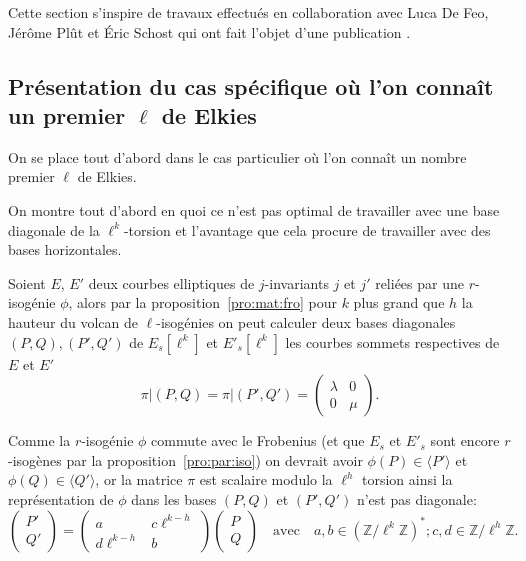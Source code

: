 \documentclass[10pt,a4paper]{book}
\theoremstyle{plain}
\theoremstyle{definition}
\theoremstyle{definition}
\theoremstyle{definition}
\theoremstyle{definition}
\theoremstyle{remark}
\theoremstyle{remark}
\theoremstyle{definition}
\begin{document}
Cette section s'inspire de travaux effectués en collaboration avec Luca De Feo,
J\'er\^ome Pl\^ut et \'Eric Schost qui ont fait l'objet d'une publication 
\cite{Defeo_Plut_Schost_2016}. 


\subsection{Présentation du cas spécifique où l'on connaît un premier $\ell$ de Elkies}
\label{ssec:cou:elk}
On se place tout d'abord dans le cas particulier où l'on connaît un nombre 
premier $\ell$  de Elkies.

On montre tout d'abord en quoi ce n'est pas optimal de travailler avec une base
diagonale de la $\ell^k$-torsion et l'avantage que cela procure de travailler 
avec des bases horizontales.

Soient $E$, $E'$ deux courbes elliptiques de $j$-invariants $j$ et $j'$ reliées par une $r$-isogénie $\phi$, alors par la proposition~\ref{pro:mat:fro} pour $k$ plus grand que $h$ la hauteur du volcan de $\ell$-isogénies on peut calculer deux bases diagonales $(P,Q),(P',Q')$ de $E_s[\ell^k]$ et $E'_s[\ell^k]$ les courbes sommets respectives de $E$ et $E'$ 
\[
\pi|(P,Q)=\pi|(P',Q')= \left( \begin{matrix}
\lambda & 0 \\
0 & \mu
\end{matrix} \right).
\]

Comme la $r$-isogénie $\phi$ commute avec le Frobenius (et que $E_s$ et $E'_s$ sont encore $r$-isogènes par la proposition~\ref{pro:par:iso}) on devrait avoir $\phi(P) \in \langle P' \rangle $ et $\phi(Q) \in \langle Q' \rangle $, or la matrice $\pi$ est scalaire modulo la $\ell^{h}$ torsion ainsi la représentation de $\phi$ dans les bases $(P,Q)$ et $(P',Q')$ n'est pas diagonale:
\[
\left(
\begin{matrix}
P' \\
Q'
\end{matrix}
\right)=
\left( 
\begin{matrix}
a &  c\ell^{k-h} \\
d\ell^{k-h} & b
\end{matrix}
\right)
\left(
\begin{matrix}
P \\
Q
\end{matrix}
\right) \quad \text{avec} \quad a,b \in \left( \mathbb{Z}/\ell^k\mathbb{Z} \right)^*; c,d \in \mathbb{Z}/\ell^{h}\mathbb{Z}.
\]
\end{document}
